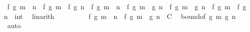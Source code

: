 \begin{isabellebody}
\ {\isachardoublequoteopen}{\isasymbar}f\ {\isacharparenleft}{\kern0pt}g\ {\isacharparenleft}{\kern0pt}m\ {\isacharplus}{\kern0pt}\ n{\isacharparenright}{\kern0pt}{\isacharparenright}{\kern0pt}\ {\isacharminus}{\kern0pt}\ {\isacharparenleft}{\kern0pt}f\ {\isacharparenleft}{\kern0pt}g\ m{\isacharparenright}{\kern0pt}\ {\isacharplus}{\kern0pt}\ f\ {\isacharparenleft}{\kern0pt}g\ n{\isacharparenright}{\kern0pt}{\isacharparenright}{\kern0pt}{\isasymbar}\ {\isasymle}\ {\isacharparenleft}{\kern0pt}{\isasymbar}f\ {\isacharparenleft}{\kern0pt}g\ {\isacharparenleft}{\kern0pt}m\ {\isacharplus}{\kern0pt}\ n{\isacharparenright}{\kern0pt}{\isacharparenright}{\kern0pt}\ {\isacharminus}{\kern0pt}\ f\ {\isacharparenleft}{\kern0pt}g\ m\ {\isacharplus}{\kern0pt}\ g\ n{\isacharparenright}{\kern0pt}{\isasymbar}\ {\isacharplus}{\kern0pt}\ {\isasymbar}f\ {\isacharparenleft}{\kern0pt}g\ m\ {\isacharplus}{\kern0pt}\ g\ n{\isacharparenright}{\kern0pt}\ {\isacharminus}{\kern0pt}\ {\isacharparenleft}{\kern0pt}f\ {\isacharparenleft}{\kern0pt}g\ m{\isacharparenright}{\kern0pt}\ {\isacharplus}{\kern0pt}\ f\ {\isacharparenleft}{\kern0pt}g\ n{\isacharparenright}{\kern0pt}{\isacharparenright}{\kern0pt}{\isasymbar}\ {\isacharcolon}{\kern0pt}{\isacharcolon}{\kern0pt}\ int{\isacharparenright}{\kern0pt}{\isachardoublequoteclose}\ \isamarkupfalse%
\ linarith\isanewline
\ \ \ \ \isamarkupfalse%
\ \isamarkupfalse%
\ {\isachardoublequoteopen}{\isachardot}{\kern0pt}{\isachardot}{\kern0pt}{\isachardot}{\kern0pt}\ {\isasymle}\ {\isasymbar}f\ {\isacharparenleft}{\kern0pt}g\ {\isacharparenleft}{\kern0pt}m\ {\isacharplus}{\kern0pt}\ n{\isacharparenright}{\kern0pt}{\isacharparenright}{\kern0pt}\ {\isacharminus}{\kern0pt}\ f\ {\isacharparenleft}{\kern0pt}g\ m\ {\isacharplus}{\kern0pt}\ g\ n{\isacharparenright}{\kern0pt}{\isasymbar}\ {\isacharplus}{\kern0pt}\ C{\isachardoublequoteclose}\ \isamarkupfalse%
\ bound{\isacharbrackleft}{\kern0pt}of\ {\isachardoublequoteopen}g\ m{\isachardoublequoteclose}\ {\isachardoublequoteopen}g\ n{\isachardoublequoteclose}{\isacharbrackright}{\kern0pt}\ \isamarkupfalse%
\ auto\isanewline
\ \ \ \ \isamarkupfalse%
\ \isamarkupfalse%

\end{isabellebody}
